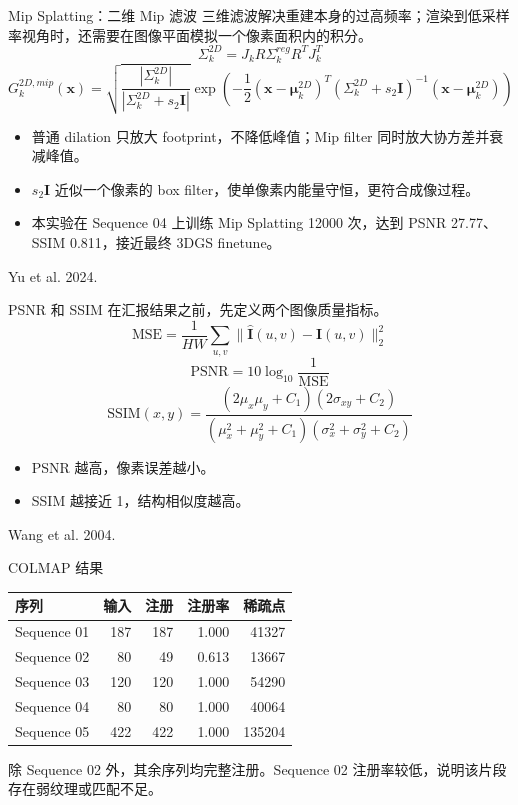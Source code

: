 \documentclass[UTF8,aspectratio=169]{ctexbeamer}
\newcommand{\refline}[1]{\vfill{\tiny #1}}
\begin{document}
\begin{frame}{Mip Splatting：二维 Mip 滤波}
\scriptsize
三维滤波解决重建本身的过高频率；渲染到低采样率视角时，还需要在图像平面模拟一个像素面积内的积分。
\[
\Sigma^{2D}_k =
J_k R \Sigma^{reg}_k R^T J_k^T
\]
\[
G^{2D,mip}_k(\mathbf{x}) =
\sqrt{
\frac{|\Sigma^{2D}_k|}
{|\Sigma^{2D}_k+s_2\mathbf{I}|}
}
\exp\left(
-\frac{1}{2}
(\mathbf{x}-\boldsymbol{\mu}^{2D}_k)^T
(\Sigma^{2D}_k+s_2\mathbf{I})^{-1}
(\mathbf{x}-\boldsymbol{\mu}^{2D}_k)
\right)
\]
\begin{itemize}
\item 普通 dilation 只放大 footprint，不降低峰值；Mip filter 同时放大协方差并衰减峰值。
\item \(s_2\mathbf{I}\) 近似一个像素的 box filter，使单像素内能量守恒，更符合成像过程。
\item 本实验在 Sequence 04 上训练 Mip Splatting 12000 次，达到 PSNR 27.77、SSIM 0.811，接近最终 3DGS finetune。
\end{itemize}
\refline{Yu et al. 2024.}
\end{frame}

\begin{frame}{PSNR 和 SSIM}
\small
在汇报结果之前，先定义两个图像质量指标。
\[
\mathrm{MSE}=
\frac{1}{HW}\sum_{u,v}
\|\hat{\mathbf{I}}(u,v)-\mathbf{I}(u,v)\|_2^2
\]
\[
\mathrm{PSNR}=10\log_{10}\frac{1}{\mathrm{MSE}}
\]
\[
\mathrm{SSIM}(x,y)=
\frac{(2\mu_x\mu_y+C_1)(2\sigma_{xy}+C_2)}
{(\mu_x^2+\mu_y^2+C_1)(\sigma_x^2+\sigma_y^2+C_2)}
\]
\begin{itemize}
\item PSNR 越高，像素误差越小。
\item SSIM 越接近 1，结构相似度越高。
\end{itemize}
\refline{Wang et al. 2004.}
\end{frame}

\begin{frame}{COLMAP 结果}
\small
\begin{tabular}{lrrrr}
\toprule
序列 & 输入 & 注册 & 注册率 & 稀疏点 \\
\midrule
Sequence 01 & 187 & 187 & 1.000 & 41327 \\
Sequence 02 & 80 & 49 & 0.613 & 13667 \\
Sequence 03 & 120 & 120 & 1.000 & 54290 \\
Sequence 04 & 80 & 80 & 1.000 & 40064 \\
Sequence 05 & 422 & 422 & 1.000 & 135204 \\
\bottomrule
\end{tabular}
\vspace{0.4cm}

除 Sequence 02 外，其余序列均完整注册。Sequence 02 注册率较低，说明该片段存在弱纹理或匹配不足。
\end{frame}
\end{document}

